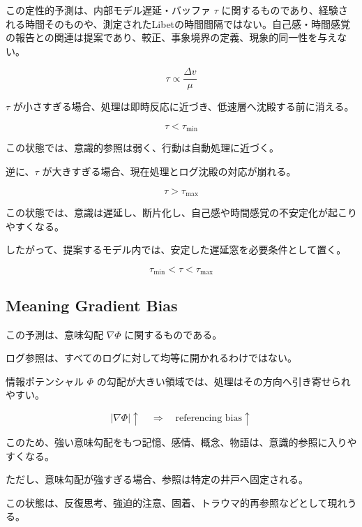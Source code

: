 この定性的予測は、内部モデル遅延・バッファ $\tau$ に関するものであり、経験される時間そのものや、測定されたLibetの時間間隔ではない。自己感・時間感覚の報告との関連は提案であり、較正、事象境界の定義、現象的同一性を与えない。

\begin{equation}
\tau \propto \frac{\Delta v}{\mu}
\end{equation}

$\tau$ が小さすぎる場合、処理は即時反応に近づき、低速層へ沈殿する前に消える。

\begin{equation}
\tau < \tau_{\min}
\end{equation}

この状態では、意識的参照は弱く、行動は自動処理に近づく。

逆に、$\tau$ が大きすぎる場合、現在処理とログ沈殿の対応が崩れる。

\begin{equation}
\tau > \tau_{\max}
\end{equation}

この状態では、意識は遅延し、断片化し、自己感や時間感覚の不安定化が起こりやすくなる。

したがって、提案するモデル内では、安定した遅延窓を必要条件として置く。

\begin{equation}
\tau_{\min} < \tau < \tau_{\max}
\end{equation}

\subsection{Meaning Gradient Bias}

この予測は、意味勾配 $\nabla \Phi$ に関するものである。

ログ参照は、すべてのログに対して均等に開かれるわけではない。

情報ポテンシャル $\Phi$ の勾配が大きい領域では、処理はその方向へ引き寄せられやすい。

\begin{equation}
|\nabla \Phi| \uparrow
\quad \Rightarrow \quad
\text{referencing bias} \uparrow
\end{equation}

このため、強い意味勾配をもつ記憶、感情、概念、物語は、意識的参照に入りやすくなる。

ただし、意味勾配が強すぎる場合、参照は特定の井戸へ固定される。

この状態は、反復思考、強迫的注意、固着、トラウマ的再参照などとして現れうる。

